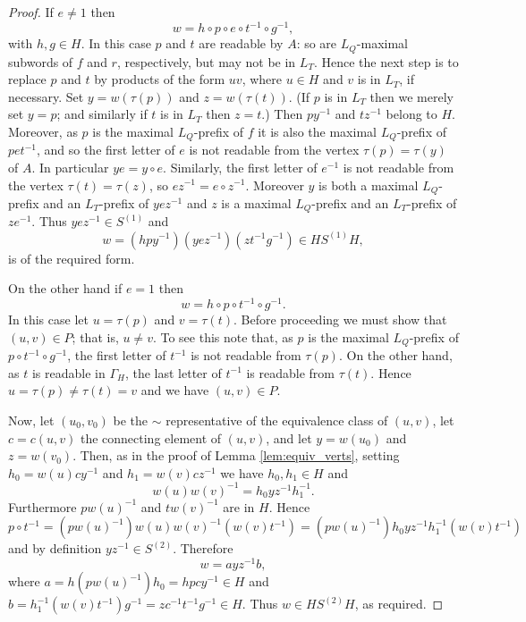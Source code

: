\documentclass[a4paper,12pt]{article}
\newcommand{\G}{\Gamma }
\renewcommand{\t}{\tau }
\numberwithin{equation}{section}
\numberwithin{figure}{section}
\begin{document}
\begin{proof}
If $e\neq 1$ then
\[w=h\circ p \circ e\circ t^{-1}\circ g^{-1},\]
with $h,g\in H$. In this case $p$ and $t$ are readable by $A$:
so are $L_Q$-maximal subwords of $f$ and $r$, respectively, but
may not be in $L_T$. Hence the next step is to replace $p$ and $t$ by
products of the form $uv$, where $u\in H$ and  $v$ is in $L_T$,
 if necessary.
Set $y=w(\t(p))$ and  $z=w(\t(t))$. (If $p$ is in $L_T$ then we
merely set $y=p$; and similarly if $t$ is in $L_T$ then $z=t$.)
Then $py^{-1}$ and $tz^{-1}$ belong to $H$. Moreover, as $p$
is the maximal $L_Q$-prefix of $f$ it is also the maximal
$L_Q$-prefix of $pet^{-1}$,  and so
  the
first letter of $e$ is not readable from the vertex $\t(p)=\t(y)$
of $A$. In
particular $ye=y\circ e$. Similarly, the first letter of $e^{-1}$
is not readable from the vertex $\t(t)=\t(z)$, so $ez^{-1}=e\circ
z^{-1}$. Moreover $y$ is both a maximal $L_Q$-prefix  and an
$L_T$-prefix of $yez^{-1}$ and $z$ is a maximal $L_Q$-prefix  and
an $L_T$-prefix of $ze^{-1}$. Thus $yez^{-1}\in S^{(1)}$ and 
\[w=(h py^{-1}) (yez^{-1})(zt^{-1} g^{-1})\in HS^{(1)}H,\]
is of the required form.%

On the other hand if $e=1$ then
\[w=h\circ p\circ t^{-1}\circ g^{-1}.\]
In this case let $u=\t(p)$ and $v=\t(t)$.
Before proceeding we must show that $(u,v)\in P$; that is, $u\neq v$. 
To see this note that, as $p$ is the maximal $L_Q$-prefix of 
$p\circ t^{-1}\circ g^{-1}$, the first letter of $t^{-1}$ is not
readable from $\t(p)$. On the other hand, as $t$ is readable in $\G_H$,
the last letter of $t^{-1}$ is readable from $\t(t)$. Hence $u=\t(p)\neq
\t(t)=v$ and we have $(u,v)\in P$. 

Now, let $(u_0,v_0)$ be the $\sim$ representative
of the equivalence class of $(u,v)$, let $c=c(u,v)$ the connecting element of 
$(u,v)$, and let 
 $y=w(u_0)$ and $z=w(v_0)$. Then,  as in the proof of Lemma
\ref{lem:equiv_verts}, setting $h_0=w(u)cy^{-1}$ and
$h_1=w(v)cz^{-1}$ we have
 $h_0,h_1\in H$ and
\[w(u)w(v)^{-1}=h_0yz^{-1}h_1^{-1}.\] Furthermore
 $p w(u)^{-1}$ and  $t w(v)^{-1}$ are in $H$. Hence
\[
p\circ t^{-1}=( p w(u)^{-1})w(u)w(v)^{-1}( w(v)t^{-1})=( p w(u)^{-1}) h_0 yz^{-1}
h_1^{-1}( w(v)t^{-1})
\]
and by definition $yz^{-1}\in S^{(2)}$. Therefore 
\[w=a yz^{-1} b,\]
where $a=h ( p w(u)^{-1}) h_0=hpcy^{-1}\in H$ and $b=h_1^{-1}( w(v)t^{-1})g^{-1}
=zc^{-1}t^{-1}g^{-1}\in H$. Thus $w\in HS^{(2)}H$, as required.  


\end{proof}
\end{document}
